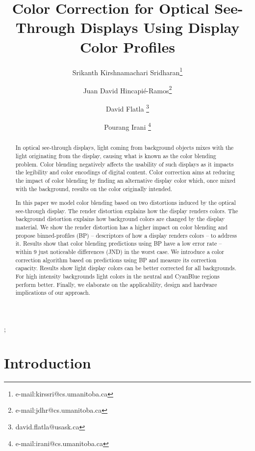\documentclass[annual]{acmsiggraph}
\title{Color Correction for Optical See-Through Displays
Using Display Color Profiles}
\author[1]{Srikanth Kirshnamachari Sridharan\thanks{e-mail:kirssri@cs.umanitoba.ca}}
\author[1]{Juan David Hincapié-Ramos\thanks{e-mail:jdhr@cs.umanitoba.ca}}
\author[2]{David Flatla \thanks{david.flatla@usask.ca}}
\author[1]{Pourang Irani  \thanks{e-mail:irani@cs.umanitoba.ca}}
\affil[1]{Department of Computer Science, Winnipeg, Manitoba, University Of Manitoba}
\affil[2]{Department of Computer Science, Saskatoon, Saskatchewan, University Of Saskatchewan}
\begin{document}

\maketitle

\begin{abstract}
In optical see-through displays, light coming from background objects mixes with the light originating from the display, causing what is known as the color blending problem. Color blending negatively affects the usability of such displays as it impacts the legibility and color encodings of digital content. Color correction aims at reducing the impact of color blending by finding an alternative display color which, once mixed with the background, results on the color originally intended.

In this paper we model color blending based on two distortions induced by the optical see-through display. The render distortion explains how the display renders colors. The background distortion explains how background colors are changed by the display material. We show the render distortion has a higher impact on color blending and propose binned-profiles (BP) – descriptors of how a display renders colors – to address it. Results show that color blending predictions using BP have a low error rate – within 9 just noticeable differences (JND) in the worst case. We introduce a color correction algorithm based on predictions using BP and measure its correction capacity. Results show light display colors can be better corrected for all backgrounds. For high intensity backgrounds light colors in the neutral and CyanBlue regions perform better. Finally, we elaborate on the applicability, design and hardware implications of our approach.

\end{abstract}

\begin{CRcatlist}
  ;
\end{CRcatlist}

\keywordlist

\TOGlinkslist

\copyrightspace

\section{Introduction}
\end{document}
